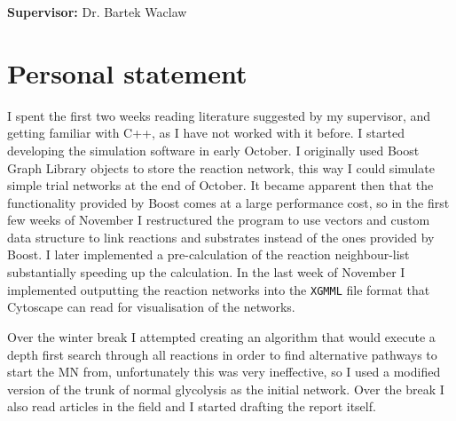 \documentclass[a4paper,12pt]{article}
\begin{document}
\vfill
{\bf Supervisor:} Dr. Bartek Waclaw
\newpage



\setcounter{page}{1}
\footruleheight{1pt}
\headruleheight{1pt}
\rhead{- \thepage}
\cfoot{}

\cleardoublepage
\tableofcontents



%	
%
%
%
%
%
%


	\newpage
	\section*{Personal statement}
	I spent the first two weeks reading literature suggested by my supervisor, and getting familiar with C++, as I have not worked with it before. 
	I started developing the simulation software in early October. 	I originally used Boost Graph Library objects to store the reaction network, this way I could simulate simple trial networks at the end of October. It became apparent then that the functionality provided by Boost comes at a large performance cost, so in the first few weeks of November I restructured the program to use vectors and custom data structure to link reactions and substrates instead of the ones provided by Boost. I later implemented a pre-calculation of the reaction neighbour-list substantially speeding up the calculation. 
	In the last week of November I implemented outputting the reaction networks into the \texttt{XGMML} file format that Cytoscape can read for visualisation of the networks. 

	Over the winter break I attempted creating an algorithm that would execute a depth first search through all reactions in order to find alternative pathways to start the MN from, unfortunately this was very ineffective, so I used a modified version of the trunk of normal glycolysis as the initial network. Over the break I also read articles in the field and I started drafting the report itself. 
\end{document}
